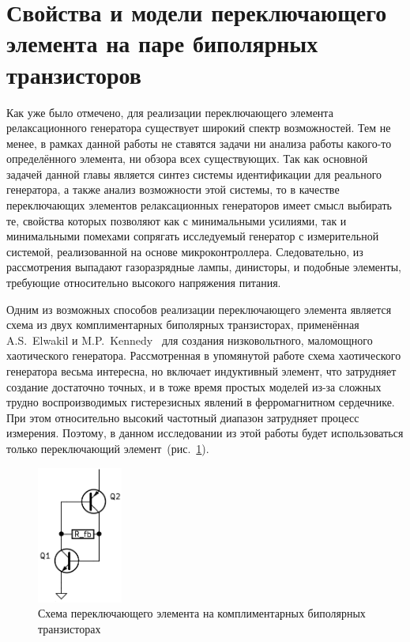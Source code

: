 \section{Свойства и модели переключающего элемента на паре биполярных транзисторов}
\label{atu:sec:relax3d_sw}

Как уже было отмечено, для реализации переключающего элемента релаксационного генератора
существует широкий спектр возможностей. Тем не менее, в рамках данной работы
не ставятся задачи ни анализа работы какого-то определённого элемента,
ни обзора всех существующих. Так как основной задачей данной главы является
синтез системы идентификации для реального генератора, а также
анализ возможности этой системы, то в качестве
переключающих элементов релаксационных генераторов имеет смысл выбирать
те, свойства которых позволяют как с минимальными усилиями,
так и минимальными помехами сопрягать исследуемый генератор
с измерительной системой, реализованной на основе микроконтроллера.
Следовательно, из рассмотрения выпадают газоразрядные лампы,
динисторы, и подобные элементы, требующие относительно
высокого напряжения питания.

Одним из возможных способов реализации переключающего элемента
является схема из двух комплиментарных биполярных транзисторах,
применённая A.S.~Elwakil и M.P.~Kennedy~\cite{kennedy1999}
для создания низковольтного, маломощного хаотического генератора.
Рассмотренная в упомянутой работе схема хаотического генератора
весьма интересна, но включает индуктивный элемент,
что затрудняет создание достаточно точных, и в тоже время простых моделей
из-за сложных трудно воспроизводимых гистерезисных явлений в
ферромагнитном сердечнике. При этом относительно высокий частотный диапазон
затрудняет процесс измерения. Поэтому, в данном исследовании
из этой работы будет использоваться только переключающий элемент~(рис.~\ref{atu:f:relax3d_switch}).

\begin{figure}[htb!]
  \centerline{\includegraphics[width=0.25\textwidth]{p/relax3d_switch.png} }
  \caption{Схема переключающего элемента на комплиментарных биполярных транзисторах}
  \label{atu:f:relax3d_switch}
\end{figure}


